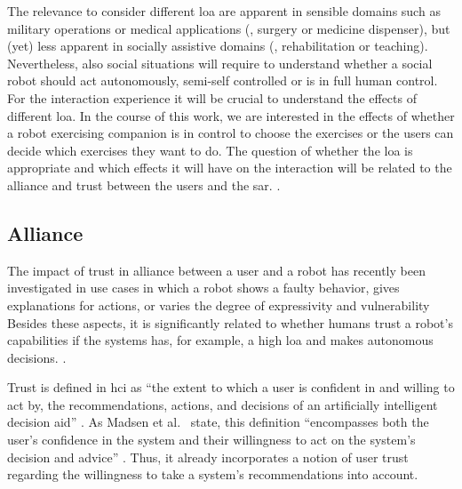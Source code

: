 \documentclass[twocolumn]{svjour3}          %
\begin{document}
The relevance to consider different \gls{loa} are apparent in sensible domains
such as military operations or medical applications (\eg{}, surgery or
medicine dispenser), but (yet) less apparent in socially assistive
domains (\eg{}, rehabilitation or teaching). Nevertheless, also social
situations will require to understand whether a social robot should act
autonomously, semi-self controlled or is in full human control. For the
interaction experience it will be crucial to understand the effects of
different \gls{loa}. In the course of this work, we are interested in the
effects of whether a robot exercising companion is in control to choose
the exercises or the users can decide which exercises they want to do.
The question of whether the \gls{loa} is appropriate and which effects it will
have on the interaction will be related to the alliance and trust
between the users and the \gls{sar}.
\autocite{beer2014toward}.

\hypertarget{alliance-and-trust}{%
\subsection{Alliance}\label{alliance-and-trust}}

The impact of trust in alliance between a user and a robot has recently been investigated in use cases in which a
robot shows a faulty behavior, gives explanations for actions, or varies
the degree of expressivity and vulnerability
\autocite{salem2015would,robinette2016overtrust,Wang,Martelaro} Besides
these aspects, it is significantly related to whether humans trust a
robot's capabilities if the systems has, for example, a high \gls{loa} and makes autonomous decisions.
\autocite{freedy2007measurement}.

Trust is defined in \gls{hci} as \enquote{the extent
to which a user is confident in and willing to act by, the
recommendations, actions, and decisions of an artificially intelligent
decision aid} \autocite[p.~25]{mcallister1995affect}. As Madsen et
al.~\autocite{madsen2000measuring} state, this definition
\enquote{encompasses both the user's confidence in the system and their
willingness to act on the system's decision and advice}
\autocite[p.~1]{madsen2000measuring}. Thus, it already incorporates a
notion of user trust regarding the willingness to take a system's
recommendations into account.
\end{document}
